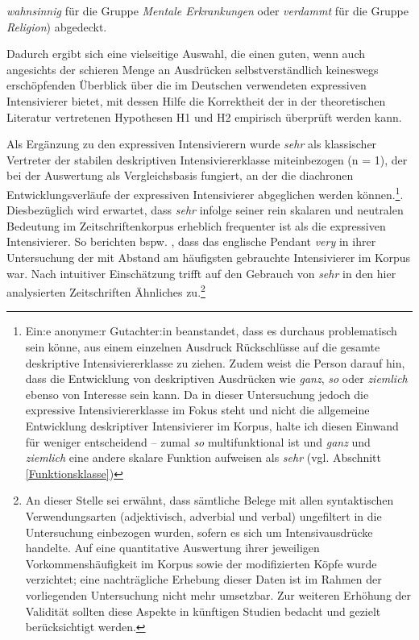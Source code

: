 \textit{wahnsinnig} für die Gruppe \textit{Mentale Erkrankungen} oder \textit{verdammt} für die Gruppe \textit{Religion}) abgedeckt.

Dadurch ergibt sich eine vielseitige Auswahl, die einen guten, wenn auch angesichts der schieren Menge an Ausdrücken selbstverständlich keineswegs erschöpfenden Überblick über die im Deutschen verwendeten expressiven Intensivierer bietet, mit dessen Hilfe die Korrektheit der in der theoretischen Literatur vertretenen Hypothesen H1 und H2 empirisch überprüft werden kann.

Als Ergänzung zu den expressiven Intensivierern wurde \textit{sehr} als klassischer Vertreter der stabilen deskriptiven Intensiviererklasse miteinbezogen (n = 1), der bei der Auswertung als Vergleichsbasis fungiert, an der die diachronen Entwicklungsverläufe der expressiven Intensivierer abgeglichen werden können.\footnote{Ein:e anonyme:r Gutachter:in beanstandet, dass es durchaus problematisch sein könne, aus einem einzelnen Ausdruck Rückschlüsse auf die gesamte deskriptive Intensiviererklasse zu ziehen. Zudem weist die Person darauf hin, dass die Entwicklung von deskriptiven Ausdrücken wie \textit{ganz}, \textit{so} oder \textit{ziemlich} ebenso von Interesse sein kann. Da in dieser Untersuchung jedoch die expressive Intensiviererklasse im Fokus steht und nicht die allgemeine Entwicklung deskriptiver Intensivierer im Korpus, halte ich diesen Einwand für weniger entscheidend – zumal \textit{so} multifunktional ist und \textit{ganz} und \textit{ziemlich} eine andere skalare Funktion aufweisen als \textit{sehr} (vgl. Abschnitt \ref{Funktionsklasse})}. Diesbezüglich wird erwartet, dass \textit{sehr} infolge seiner rein skalaren und neutralen Bedeutung im Zeitschriftenkorpus erheblich frequenter ist als die expressiven Intensivierer. So berichten bspw. \citet[266]{Ito.2003}, dass das englische Pendant \textit{very} in ihrer Untersuchung der mit Abstand am häufigsten gebrauchte Intensivierer im Korpus war. Nach intuitiver Einschätzung trifft auf den Gebrauch von \textit{sehr} in den hier analysierten Zeitschriften Ähnliches zu.\footnote{An dieser Stelle sei erwähnt, dass sämtliche Belege mit allen syntaktischen Verwendungsarten (adjektivisch, adverbial und verbal) ungefiltert in die Untersuchung einbezogen wurden, sofern es sich um Intensivausdrücke handelte. Auf eine quantitative Auswertung ihrer jeweiligen Vorkommenshäufigkeit im Korpus sowie der modifizierten Köpfe wurde verzichtet; eine nachträgliche Erhebung dieser Daten ist im Rahmen der vorliegenden Untersuchung nicht mehr umsetzbar. Zur weiteren Erhöhung der Validität sollten diese Aspekte in künftigen Studien bedacht und gezielt berücksichtigt werden.}

